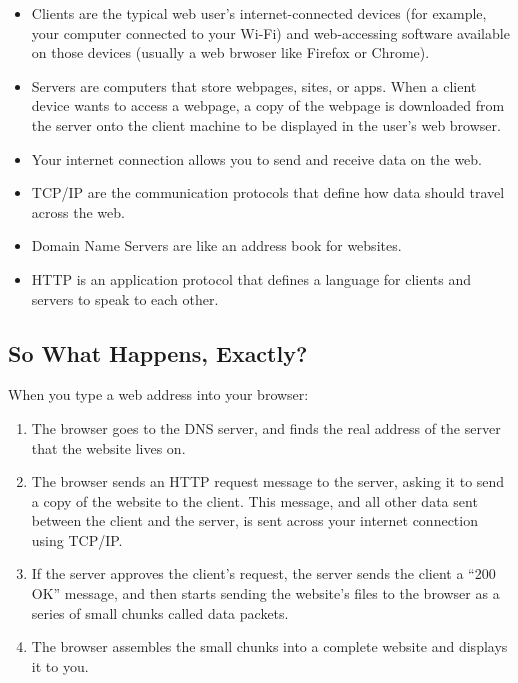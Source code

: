 \documentclass[]{book}
\providecommand{\tightlist}{%
  \setlength{\itemsep}{0pt}\setlength{\parskip}{0pt}}
\begin{document}
\begin{itemize}
\tightlist
\item
  Clients are the typical web user's internet-connected devices (for example, your computer connected to your Wi-Fi) and web-accessing software available on those devices (usually a web brwoser like Firefox or Chrome).
\item
  Servers are computers that store webpages, sites, or apps. When a client device wants to access a webpage, a copy of the webpage is downloaded from the server onto the client machine to be displayed in the user's web browser.
\item
  Your internet connection allows you to send and receive data on the web.
\item
  TCP/IP are the communication protocols that define how data should travel across the web.
\item
  Domain Name Servers are like an address book for websites.
\item
  HTTP is an application protocol that defines a language for clients and servers to speak to each other.
\end{itemize}

\hypertarget{so-what-happens-exactly}{%
\subsection{So What Happens, Exactly?}\label{so-what-happens-exactly}}

When you type a web address into your browser:

\begin{enumerate}
\def\labelenumi{\arabic{enumi}.}
\tightlist
\item
  The browser goes to the DNS server, and finds the real address of the server that the website lives on.
\item
  The browser sends an HTTP request message to the server, asking it to send a copy of the website to the client. This message, and all other data sent between the client and the server, is sent across your internet connection using TCP/IP.
\item
  If the server approves the client's request, the server sends the client a ``200 OK'' message, and then starts sending the website's files to the browser as a series of small chunks called data packets.
\item
  The browser assembles the small chunks into a complete website and displays it to you.
\end{enumerate}
\end{document}
